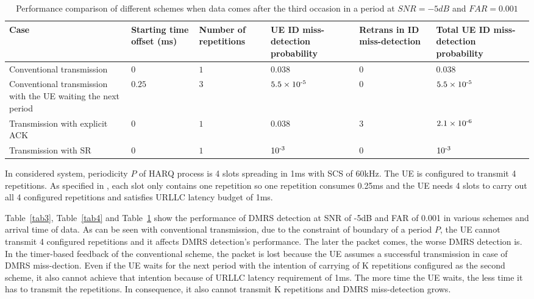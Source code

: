 \documentclass[conference]{IEEEtran}
\begin{document}
\begin{table}[htbp]
\caption{Performance comparison of different schemes when data comes after the third occasion in a period at $SNR = -5dB$ and $FAR = 0.001$}
\begin{center}
\begin{tabular}{|p{6em}|p{3em}|p{3em}|p{3.2em}|p{3.2em}|p{3.2em}|}
 \hline
 \textbf{Case} & \textbf{Starting time offset (ms)}&\textbf{Number of repetitions}&\textbf{UE ID miss-detection probability}&\textbf{Retrans in ID miss-detection}&\textbf{Total UE ID miss-detection probability}\\
 \hline
 Conventional transmission&$0$&$1$&$0.038$&$0$&$0.038$\\
 \hline
  Conventional transmission with the UE waiting the next period&$0.25$&$3$&$5.5\times10\textsuperscript{-5}$&$0$&$5.5\times10\textsuperscript{-5}$\\
 \hline
Transmission with explicit ACK&$0$&$1$&$0.038$&$3$&$2.1\times10\textsuperscript{-6}$\\
\hline
Transmission with SR&$0$&$1$&$10\textsuperscript{-3}$&$0$&$10\textsuperscript{-3}$\\
 \hline
\end{tabular}
\label{tab5}
\end{center}
\vspace{-7mm}
\end{table}

In considered system, periodicity $P$ of HARQ process is 4 slots spreading in 1ms with SCS of 60kHz. The UE is configured to transmit 4 repetitions. As specified in \cite{ad2}, each slot only contains one repetition so one repetition consumes 0.25ms and the UE needs 4 slots to carry out all 4 configured repetitions and satisfies URLLC latency budget of 1ms.

Table~\ref{tab3}, Table~\ref{tab4} and Table~\ref{tab5} show the performance of DMRS detection at SNR of -5dB and FAR of 0.001 in various schemes and arrival time of data. As can be seen with conventional  transmission, due to the constraint of boundary of a period $P$, the UE cannot transmit 4 configured repetitions and it affects DMRS detection's performance. The later the packet comes, the worse DMRS detection is. In the timer-based feedback of the conventional scheme, the packet is lost because the UE assumes a successful transmission in case of DMRS miss-dection. Even if the UE waits for the next period with the intention of carrying of K repetitions configured as the second scheme, it also cannot achieve that intention because of URLLC latency requirement of 1ms. The more time the UE waits, the less time it has to transmit the repetitions. In consequence, it also cannot transmit K repetitions and DMRS miss-detection grows.
\end{document}
